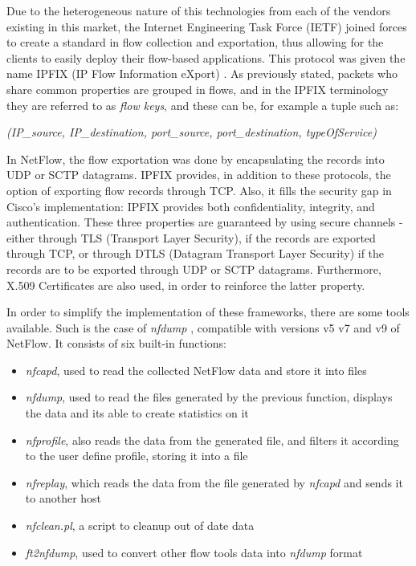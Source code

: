 \documentclass[runningheads,a4paper]{llncs}
\begin{document}
Due to the heterogeneous nature of this technologies from each of the vendors existing in this market, the Internet Engineering Task Force (IETF) joined forces to create a standard in flow collection and exportation, thus allowing for the clients to easily deploy their flow-based applications. This protocol was given the name IPFIX (IP Flow Information eXport) \cite{Claise2013}. As previously stated, packets who share common properties are grouped in flows, and in the IPFIX terminology they are referred to as \textit{flow keys}, and these can be, for example a tuple such as:


\emph{(IP\_source, IP\_destination, port\_source, port\_destination, typeOfService)}


In NetFlow, the flow exportation was done by  encapsulating the records into UDP or SCTP datagrams. IPFIX provides, in addition to these protocols, the option of exporting flow records through TCP. Also, it fills the security gap in Cisco's implementation: IPFIX provides both confidentiality, integrity, and authentication. These three properties are guaranteed by using secure channels - either through TLS (Transport Layer Security), if the records are exported through TCP, or through DTLS (Datagram Transport Layer Security) if the records are to be exported through UDP or SCTP datagrams. Furthermore, X.509 Certificates are also used, in order to reinforce the latter property.

In order to simplify the implementation of these frameworks, there are some tools available. Such is the case of \textit{nfdump} \cite{nfdump}, compatible with versions v5 v7 and v9 of NetFlow. It consists of six built-in functions:
\begin{itemize}
\item \textit{nfcapd}, used to read the collected NetFlow data and store it into files
\item \textit{nfdump}, used to read the files generated by the previous function, displays the data and its able to create statistics on it
\item \textit{nfprofile}, also reads the data from the generated file, and filters it according to the user define profile, storing it into a file
\item \textit{nfreplay}, which reads the data from the file generated by \textit{nfcapd} and sends it to another host
\item \textit{nfclean.pl}, a script to cleanup out of date data
\item \textit{ft2nfdump}, used to convert other flow tools data into \textit{nfdump} format
\end{itemize} 
\end{document}
